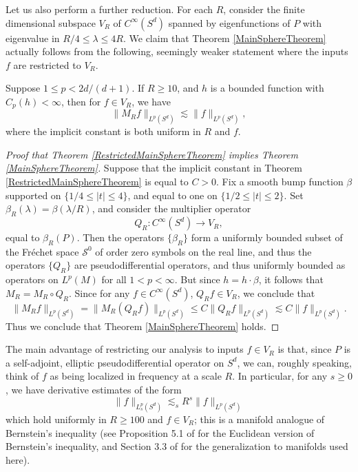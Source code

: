 Let us also perform a further reduction. For each $R$, consider the finite dimensional subspace $V_R$ of $C^\infty(S^d)$ spanned by eigenfunctions of $P$ with eigenvalue in $R/4 \leq \lambda \leq 4R$. We claim that Theorem \ref{MainSphereTheorem} actually follows from the following, seemingly weaker statement where the inputs $f$ are restricted to $V_R$.

\begin{theorem} \label{RestrictedMainSphereTheorem}
    Suppose $1 \leq p < 2d/(d+1)$. If $R \geq 10$, and $h$ is a bounded function with $C_p(h) < \infty$, then for $f \in V_R$, we have
    \[ \| M_R f \|_{L^p(S^d)} \lesssim \| f \|_{L^p(S^d)}, \]
    where the implicit constant is both uniform in $R$ and $f$.
\end{theorem}

\begin{proof}[Proof that Theorem \ref{RestrictedMainSphereTheorem} implies Theorem \ref{MainSphereTheorem}]
    Suppose that the implicit constant in Theorem \ref{RestrictedMainSphereTheorem} is equal to $C > 0$. Fix a smooth bump function $\beta$ supported on $\{ 1/4 \leq |t| \leq 4 \}$, and equal to one on $\{ 1/2 \leq |t| \leq 2 \}$. Set $\beta_R(\lambda) = \beta(\lambda / R)$, and consider the multiplier operator
    \[ Q_R: C^\infty(S^d) \to V_R, \]
    equal to $\beta_R( P )$. Then the operators $\{ \beta_R \}$ form a uniformly bounded subset of the Fr\'{e}chet space $\mathcal{S}^0$ of order zero symbols on the real line, and thus the operators $\{ Q_R \}$ are pseudodifferential operators, and thus uniformly bounded as operators on $L^p(M)$ for all $1 < p < \infty$. But since $h = h \cdot \beta$, it follows that $M_R = M_R \circ Q_R$. Since for any $f \in C^\infty(S^d)$, $Q_R f \in V_R$, we conclude that
    \[ \| M_R f \|_{L^p(S^d)} = \| M_R (Q_R f) \|_{L^p(S^d)} \leq C \| Q_R f \|_{L^p(S^d)} \lesssim C \| f \|_{L^p(S^d)}. \]
    Thus we conclude that Theorem \ref{MainSphereTheorem} holds.
\end{proof}

The main advantage of restricting our analysis to inputs $f \in V_R$ is that, since $P$ is a self-adjoint, elliptic pseudodifferential operator on $S^d$, we can, roughly speaking, think of $f$ as being localized in frequency at a scale $R$. In particular, for any $s \geq 0$, we have derivative estimates of the form
%
\begin{equation} \label{ManifoldBernsteinInequality}
    \| f \|_{L^p_s(S^d)} \lesssim_s R^s \| f \|_{L^p(S^d)}
\end{equation}
%
which hold uniformly in $R \geq 100$ and $f \in V_R$; this is a manifold analogue of Bernstein's inequality (see Proposition 5.1 of \cite{Wolff} for the Euclidean version of Bernstein's inequality, and Section 3.3 of \cite{Sogge} for the generalization to manifolds used here).

